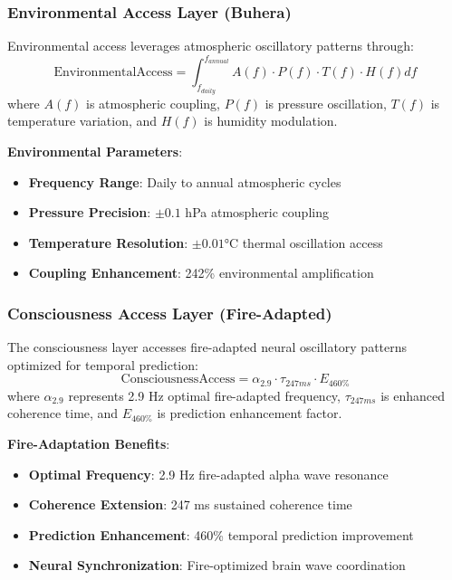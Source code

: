 ﻿\documentclass[11pt,a4paper]{article}
\begin{document}
\subsubsection{Environmental Access Layer (Buhera)}

\begin{definition}
Environmental access leverages atmospheric oscillatory patterns through:
\begin{equation}
\text{EnvironmentalAccess} = \int_{f_{daily}}^{f_{annual}} A(f) \cdot P(f) \cdot T(f) \cdot H(f) df
\end{equation}
where $A(f)$ is atmospheric coupling, $P(f)$ is pressure oscillation, $T(f)$ is temperature variation, and $H(f)$ is humidity modulation.
\end{definition}

\textbf{Environmental Parameters}:
\begin{itemize}
\item \textbf{Frequency Range}: Daily to annual atmospheric cycles
\item \textbf{Pressure Precision}: $\pm 0.1$ hPa atmospheric coupling
\item \textbf{Temperature Resolution}: $\pm 0.01$°C thermal oscillation access
\item \textbf{Coupling Enhancement}: 242\% environmental amplification
\end{itemize}

\subsubsection{Consciousness Access Layer (Fire-Adapted)}

\begin{definition}
The consciousness layer accesses fire-adapted neural oscillatory patterns optimized for temporal prediction:
\begin{equation}
\text{ConsciousnessAccess} = \alpha_{2.9} \cdot \tau_{247ms} \cdot E_{460\%}
\end{equation}
where $\alpha_{2.9}$ represents 2.9 Hz optimal fire-adapted frequency, $\tau_{247ms}$ is enhanced coherence time, and $E_{460\%}$ is prediction enhancement factor.
\end{definition}

\textbf{Fire-Adaptation Benefits}:
\begin{itemize}
\item \textbf{Optimal Frequency}: 2.9 Hz fire-adapted alpha wave resonance
\item \textbf{Coherence Extension}: 247 ms sustained coherence time
\item \textbf{Prediction Enhancement}: 460\% temporal prediction improvement
\item \textbf{Neural Synchronization}: Fire-optimized brain wave coordination
\end{itemize}
\end{document}
